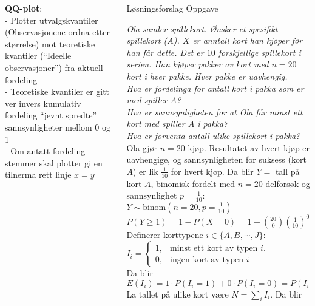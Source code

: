 \documentclass[final,hyperref={pdfpagelabels=false}]{beamer}
\newcommand{\oppgave}[2]
{\center\normalsize Oppgave\\
	{\footnotesize\raggedright \textit{#1}\\#2\\}}
\begin{document}
\begin{frame}{}
\begin{columns}[t]
\begin{column}{.33\linewidth}
\begin{block}{}
{					\textbf{QQ-plot}:\\
					- Plotter utvalgskvantiler (Observasjonene ordna etter størrelse) mot teoretiske kvantiler (``Ideelle observasjoner'') fra aktuell fordeling\\
					- Teoretiske kvantiler er gitt ver invers kumulativ fordeling ``jevnt spredte'' sannsynligheter mellom 0 og 1\\
					- Om antatt fordeling stemmer skal plotter gi en tilnerma rett linje $x=y$\\
				}
			\end{block}
		\end{column}
		\begin{column}{.33\linewidth}
			\begin{block}{Løsningsforslag}
				\oppgave{Ola samler spillekort.
					Ønsker et spesifikt spillekort ($A$).
					$X$ er anntall kort han kjøper før han får dette.
					Det er $10$ forskjellige spillekort i serien.
					Han kjøper pakker av kort med $n=20$ kort i hver pakke.
					Hver pakke er uavhengig.\\
					Hva er fordelinga for antall kort i pakka som er med spiller $A$?\\
					Hva er sannsynligheten for at Ola får minst ett kort med spiller $A$ i pakka?\\
					Hva er forventa antall ulike spillekort i pakka?}
				{Ola gjør $n=20$ kjøp.
					Resultatet av hvert kjøp er uavhengige, og sannsynligheten for suksess (kort $A$) er lik $\frac{1}{10}$ for hvert kjøp.
					Da blir $Y=$ tall på kort $A$, binomisk fordelt med $n=20$ delforsøk og sannsynlighet $p=\frac{1}{10}$:\\
					$Y \sim \text{binom}\left(n=20,p=\frac{1}{10}\right)$\\
					$P(Y\geq 1) = 1-P(X=0)=1-\binom{20}{0}\left(\frac{1}{10}\right)^0\left(1-\frac{1}{10}\right)^{20}=1-0.122=0.878$\\
					Definerer korttypene $i\in \{A,B,\cdots,J\}$:\\
					$I_i=\begin{cases}
						1, &\text{minst ett kort av typen $i$.}\\
						0, &\text{ingen kort av typen $i$}
					\end{cases}$\\
					Da blir \\
					$E(I_i)=1\cdot P(I_i=1)+0\cdot P(I_i=0)=P(I_i=1)=P(Y\geq 1)=0.878$\\
					La tallet på ulike kort være $N=\sum_i I_i$. Da blir\\
}
\end{block}
\end{column}
\end{columns}
\end{frame}
\end{document}
